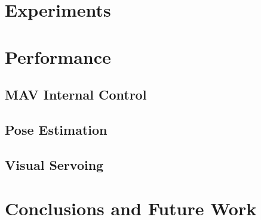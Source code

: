 \documentclass[letterpaper, 10 pt, conference]{ieeeconf}
\begin{document}

\section{Experiments}


\section{Performance}

\subsection{MAV Internal Control}

\subsection{Pose Estimation}

\subsection{Visual Servoing}

\addtolength{\textheight}{-0cm}


\section{Conclusions and Future Work}
\end{document}
